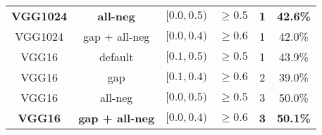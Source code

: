 \documentclass[runningheads]{llncs}
\begin{document}
\begin{table}[b!]
\begin{center}
\begin{tabular}{cccccc}
\textbf{  VGG1024 } & \textbf{ all-neg } & \begin{math}\mathbf{ {[{0.0},{0.5})} }\end{math}  &  \begin{math}\mathbf{\geq 0.5 }\end{math}  & \textbf{ 1 } & \textbf{ 42.6\%} \\
  VGG1024 & gap + all-neg &\begin{math} {[{0.0},{0.4})} \end{math} & \begin{math}\geq 0.6 \end{math} & 1 & 42.0\% \\
\hline
  VGG16 & default &\begin{math} {[{0.1},{0.5})} \end{math} & \begin{math}\geq 0.5 \end{math} & 1 & 43.9\% \\
  VGG16 & gap &\begin{math} {[{0.1},{0.4})} \end{math} & \begin{math}\geq 0.6 \end{math} & 2 & 39.0\% \\
  VGG16 & all-neg &\begin{math} {[{0.0},{0.5})} \end{math} & \begin{math}\geq 0.5 \end{math} & 3 & 50.0\% \\
\textbf{  VGG16 } & \textbf{ gap + all-neg } & \begin{math}\mathbf{ {[{0.0},{0.4})} }\end{math}  &  \begin{math}\mathbf{\geq 0.6 }\end{math}  & \textbf{ 3 } & \textbf{ 50.1\%} \\
\hline
\end{tabular} \end{center}
\end{table}
\end{document}
